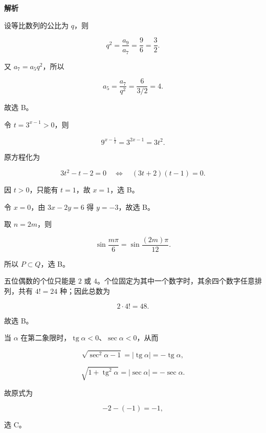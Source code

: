 \begin{answer}
\textbf{解析}


设等比数列的公比为 $q$，则

\nopagebreak[4]
\[
q^2=\frac{a_9}{a_7}=\frac96=\frac32.
\]

又 $a_7=a_5q^2$，所以

\nopagebreak[4]
\[
a_5=\frac{a_7}{q^2}=\frac6{3/2}=4.
\]

故选 B。


令 $t=3^{x-1}>0$，则

\nopagebreak[4]
\[
9^{x-\frac12}=3^{2x-1}=3t^2.
\]

原方程化为

\nopagebreak[4]
\[
3t^2-t-2=0
\quad\Longleftrightarrow\quad
(3t+2)(t-1)=0.
\]

因 $t>0$，只能有 $t=1$，故 $x=1$，选 B。


令 $x=0$，由 $3x-2y=6$ 得 $y=-3$，故选 B。


取 $n=2m$，则

\nopagebreak[4]
\[
\sin\frac{m\pi}{6}=\sin\frac{(2m)\pi}{12}.
\]

所以 $P\subset Q$，选 B。


五位偶数的个位只能是 $2$ 或 $4$。个位固定为其中一个数字时，其余四个数字任意排列，共有 $4!=24$ 种；因此总数为

\nopagebreak[4]
\[
2\cdot4!=48.
\]

故选 B。


当 $\alpha$ 在第二象限时，$\operatorname{tg}\alpha<0$、$\operatorname{sec}\alpha<0$，从而

\nopagebreak[4]
\[
\sqrt{\operatorname{sec}^2\alpha-1}
=|\operatorname{tg}\alpha|
=-\operatorname{tg}\alpha,
\]

\nopagebreak[4]
\[
\sqrt{1+\operatorname{tg}^2\alpha}
=|\operatorname{sec}\alpha|
=-\operatorname{sec}\alpha.
\]

故原式为

\nopagebreak[4]
\[
-2-(-1)=-1,
\]

选 C。


\end{answer}
